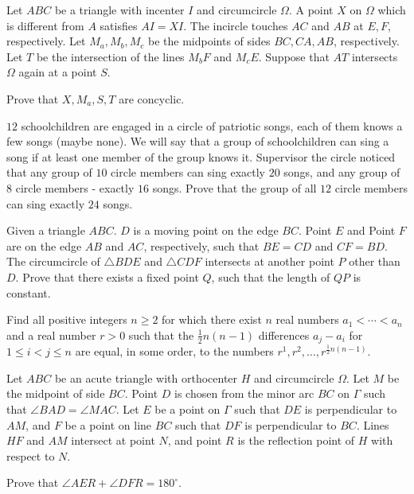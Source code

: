 \documentclass[11pt]{scrartcl}
\begin{document}
\begin{problem}[727078403801409]
Let $ABC$ be a triangle with incenter $I$ and circumcircle $\Omega$. A point $X$ on $\Omega$ which is different from $A$ satisfies $AI=XI$. The incircle touches $AC$ and $AB$ at $E, F$, respectively. Let $M_a, M_b, M_c$ be the midpoints of sides $BC, CA, AB$, respectively. Let $T$ be the intersection of the lines $M_bF$ and $M_cE$. Suppose that $AT$ intersects $\Omega$ again at a point $S$.

Prove that $X, M_a, S, T$ are concyclic.
\end{problem}
\begin{problem}[8024569764169071557]
$12$ schoolchildren are engaged in a circle of patriotic songs, each of them knows a few songs (maybe none). We will say that a group of schoolchildren can sing a song if at least one member of the group knows it. Supervisor the circle noticed that any group of $10$ circle members can sing exactly $20$ songs, and any group of $8$ circle members - exactly $16$ songs. Prove that the group of all $12$ circle members can sing exactly $24$ songs.
\end{problem}
\begin{problem}[117986541208663]
Given a triangle $ABC$. $D$ is a moving point on the edge $BC$. Point $E$ and Point $F$ are on the edge $AB$ and $AC$, respectively, such that $BE=CD$ and $CF=BD$. The circumcircle of $\triangle BDE$ and $\triangle CDF$ intersects at another point $P$ other than $D$. Prove that there exists a fixed point $Q$, such that the length of $QP$ is constant.
\end{problem}
\begin{problem}[596902679696332]
Find all positive integers $n \geqslant 2$ for which there exist $n$ real numbers $a_1<\cdots< a_n$ and a real number $r>0$ such that the $\tfrac{1}{2}n(n-1)$ differences $a_j-a_i$ for $1 \leqslant i<j \leqslant n$ are equal, in some order, to the numbers $r^1,r^2,\ldots,r^{\frac{1}{2}n(n-1)}$.
\end{problem}
\begin{problem}[227919487650283]
Let $ABC$ be an acute triangle with orthocenter $H$ and circumcircle $\Omega$. Let $M$ be the midpoint of side $BC$. Point $D$ is chosen from the minor arc $BC$ on $\Gamma$ such that $\angle BAD = \angle MAC$. Let $E$ be a point on $\Gamma$ such that $DE$ is perpendicular to $AM$, and $F$ be a point on line $BC$ such that $DF$ is perpendicular to $BC$. Lines $HF$ and $AM$ intersect at point $N$, and point $R$ is the reflection point of $H$ with respect to $N$.

Prove that $\angle AER + \angle DFR = 180^\circ$.
\end{problem}
\end{document}
